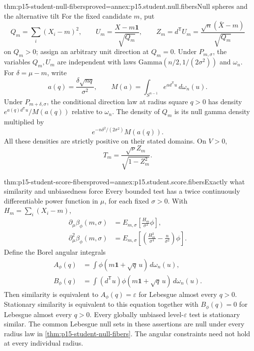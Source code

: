 \begin{hbtheorem}{thm:p15-student-null-fibers}{proved=annex:p15.student.null.fibers}{Null spheres and the alternative tilt}
For the fixed candidate \(m\), put
\[
 Q_m=\sum_i(X_i-m)^2,\qquad
 U_m=\frac{X-m\mathbf1}{\sqrt{Q_m}},\qquad
 Z_m=d^{\mathsf T}U_m=\frac{\sqrt n(\bar X-m)}{\sqrt{Q_m}}
\]
on \(Q_m>0\); assign an arbitrary unit direction at \(Q_m=0\).
Under \(P_{m,\sigma}\), the variables \(Q_m,U_m\) are
independent with laws
\(\mathrm{Gamma}(n/2,1/(2\sigma^2))\) and \(\omega_n\).
For \(\delta=\mu-m\), write
\[
 a(q)=\frac{\delta\sqrt{nq}}{\sigma^2},\qquad
 M(a)=\int_{S^{n-1}}e^{a d^{\mathsf T}u}\,d\omega_n(u).
\]
Under \(P_{m+\delta,\sigma}\), the conditional direction law
at radius square \(q>0\) has density
\(e^{a(q)d^{\mathsf T}u}/M(a(q))\) relative to \(\omega_n\).
The density of \(Q_m\) is its null gamma density multiplied by
\[
                  e^{-n\delta^2/(2\sigma^2)}M(a(q)).
\]
All these densities are strictly positive on their stated domains.
On \(V>0\),
\[
        T_m=\frac{\sqrt\nu Z_m}{\sqrt{1-Z_m^2}}.
\]
\end{hbtheorem}

\begin{hbtheorem}{thm:p15-student-score-fibers}{proved=annex:p15.student.score.fibers}{Exactly what similarity and unbiasedness force}
Every bounded test has a twice continuously differentiable
power function in \(\mu\), for each fixed \(\sigma>0\).
With \(H_m=\sum_i(X_i-m)\),
\[
\begin{aligned}
 \partial_\mu\beta_\phi(m,\sigma)
     &=E_{m,\sigma}\!\left[\frac{H_m}{\sigma^2}\phi\right],\\
 \partial_\mu^2\beta_\phi(m,\sigma)
     &=E_{m,\sigma}\!\left[
          \left(\frac{H_m^2}{\sigma^4}-\frac n{\sigma^2}\right)\phi
                       \right].
\end{aligned}
\]
Define the Borel angular integrals
\[
\begin{aligned}
 A_\phi(q)&=\int\phi(m\mathbf1+\sqrt q\,u)\,d\omega_n(u),\\
 B_\phi(q)&=\int (d^{\mathsf T}u)
                   \phi(m\mathbf1+\sqrt q\,u)\,d\omega_n(u).
\end{aligned}
\]
Then similarity is equivalent to
\(A_\phi(q)=\varepsilon\) for Lebesgue almost every \(q>0\).
Stationary similarity is equivalent to this equation together
with \(B_\phi(q)=0\) for Lebesgue almost every \(q>0\).
Every globally unbiased level-\(\varepsilon\) test is stationary
similar. The common Lebesgue null sets in these assertions are
null under every radius law in
\cref{thm:p15-student-null-fibers}.
The angular constraints need not hold at every individual radius.
\end{hbtheorem}

